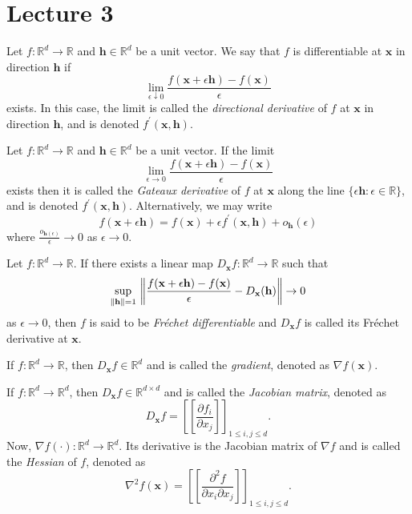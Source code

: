 \section{Lecture 3}

\begin{defn}
    Let $f \colon \mathbb{R}^d \to \mathbb{R}$ and $\mathbf{h} \in \mathbb{R}^d$ be a unit vector. We say that $f$ is differentiable at $\mathbf{x}$ in direction $\mathbf{h}$ if
    \[
        \lim_{\epsilon \downarrow 0} \frac{f(\mathbf{x}+\epsilon\mathbf{h}) - f(\mathbf{x})}{\epsilon}
    \]
    exists. In this case, the limit is called the \emph{directional derivative} of $f$ at $\mathbf{x}$ in direction $\mathbf{h}$, and is denoted $f^{\prime}(\mathbf{x},\mathbf{h})$.
\end{defn}

\begin{defn}
    Let $f \colon \mathbb{R}^d \to \mathbb{R}$ and $\mathbf{h} \in \mathbb{R}^d$ be a unit vector. If the limit
    \[
        \lim_{\epsilon \to 0} \frac{f(\mathbf{x}+\epsilon\mathbf{h}) - f(\mathbf{x})}{\epsilon}
    \]
    exists then it is called the \emph{Gateaux derivative} of $f$ at $\mathbf{x}$ along the line $\{\epsilon \mathbf{h} \colon \epsilon \in \mathbb{R}\}$, and is denoted $f^{\prime}(\mathbf{x},\mathbf{h})$. Alternatively, we may write 
    \[
    f(\mathbf{x} + \epsilon\mathbf{h}) = f(\mathbf{x}) + \epsilon f^{\prime}(\mathbf{x},\mathbf{h}) + o_{\mathbf{h}}(\epsilon)
    \]
    where $ \frac{o_{\mathbf{h}(\epsilon)}}{\epsilon} \to 0$ as $\epsilon \to 0$.
\end{defn}

\begin{defn}
    Let $f \colon \mathbb{R}^d \to \mathbb{R}$. If there exists a linear map $D_{\mathbf{x}}f \colon \mathbb{R}^d \to \mathbb{R}$ such that
    \[
        \sup_{\norm{\mathbf{h}} = 1} \, \norm{\frac{f(\mathbf{x}+\epsilon\mathbf{h}) - f(\mathbf{x})}{\epsilon} - D_{\mathbf{x}}(\mathbf{h})} \to 0
    \]
    as $\epsilon \to 0$, then $f$ is said to be \emph{Fréchet differentiable} and $D_{\mathbf{x}}f$ is called its Fréchet derivative at $\mathbf{x}$.
\end{defn}

If $f \colon \mathbb{R}^d \to \mathbb{R}$, then $D_{\mathbf{x}}f \in \mathbb{R}^d$ and is called the \emph{gradient}, denoted as $\nabla f(\mathbf{x})$. 

If $f \colon \mathbb{R}^d \to \mathbb{R}^d$, then $D_{\mathbf{x}}f \in \mathbb{R}^{d \times d}$ and is called the \emph{Jacobian matrix}, denoted as
\[
    D_{\mathbf{x}}f = \left[\left[ \frac{\partial f_i}{\partial x_j}\right]\right]_{1 \leq i,j \leq d}.
\]
Now, $\nabla f(\cdot) \colon \mathbb{R}^d \to \mathbb{R}^d$. Its derivative is the Jacobian matrix of $\nabla f$ and is called the \emph{Hessian} of $f$, denoted as
\[
    \nabla^2 f(\mathbf{x}) = \left[\left[ \frac{\partial^2 f}{\partial x_i \partial x_j}\right]\right]_{1 \leq i,j \leq d}.
\]

